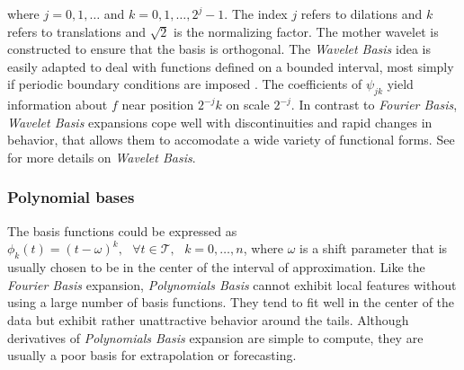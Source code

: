 where $j = 0,1,\dots$ and $k = 0,1,\dots,2^j -1$. The index $j$ refers to dilations and $k$ refers to translations and $\sqrt{2}$ is the normalizing factor. The mother wavelet is constructed to ensure that the basis is orthogonal. The \textit{Wavelet Basis} idea is easily adapted to deal with functions defined on a bounded interval, most simply if periodic boundary conditions are imposed \citep{olberd:ramsay}. The coefficients of $\psi_{jk}$ yield information about $f$ near position $2^{-j}k$ on scale $2^{-j}$. In contrast to \textit{Fourier Basis}, \textit{Wavelet Basis} expansions cope well with discontinuities and rapid changes in behavior, that allows them to accomodate a wide variety of functional forms. See \cite{walker2008} for more details on \textit{Wavelet Basis}.
\subsubsection*{Polynomial bases}
The basis functions could be expressed as $\phi_{k}(t)=\left(t-\omega\right)^{k},\text{ }\forall t \in \mathcal{T}, \text{ }k=0,\dots,n$, where $\omega$ is a shift parameter that is usually chosen to be in the center of the interval of approximation. Like the \textit{Fourier Basis} expansion, \textit{Polynomials Basis} cannot exhibit local features without using a large number of basis functions. They tend to fit well in the center of the data but exhibit rather unattractive behavior around the tails. Although derivatives of \textit{Polynomials Basis} expansion are simple to compute, they are usually a poor basis for extrapolation or forecasting.


